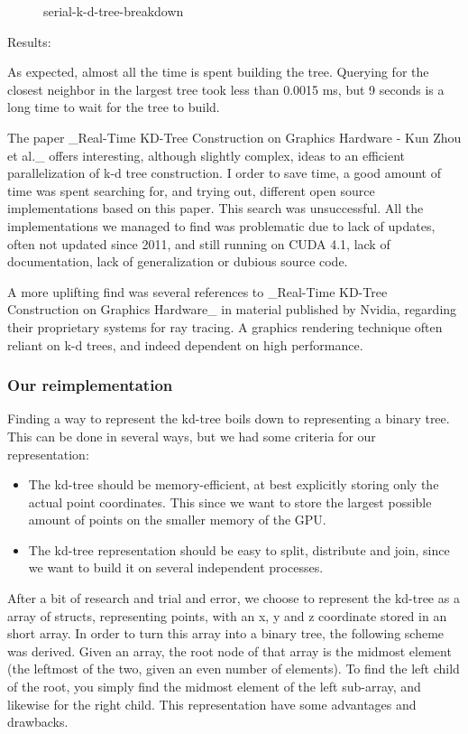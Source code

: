 \begin{enumerate}
\begin{enumerate}
\begin{figure}[ht!]
\caption{serial-k-d-tree-breakdown}
\label{fig:serial_kd_tree_breakdown}
\end{figure}

Results:

As expected, almost all the time is spent building the tree. Querying for the closest neighbor in the largest tree took less than 0.0015 ms, but 9 seconds is a long time to wait for the tree to build.

The paper _Real-Time KD-Tree Construction on Graphics Hardware - Kun Zhou et al._ offers interesting, although slightly complex, ideas to an efficient parallelization of k-d tree construction. I order to save time, a good amount of time was spent searching for, and trying out, different open source implementations based on this paper. This search was unsuccessful. All the implementations we managed to find was problematic due to lack of updates, often not updated since 2011, and still running on CUDA 4.1, lack of documentation, lack of generalization or dubious source code.

A more uplifting find was several references to _Real-Time KD-Tree Construction on Graphics Hardware_ in material published by Nvidia, regarding their proprietary systems for ray tracing. A graphics rendering technique often reliant on k-d trees, and indeed dependent on high performance.

\subsubsection{Our reimplementation} %
\label{ssub:our_reimplementation}

Finding a way to represent the kd-tree boils down to representing a binary tree. This can be done in several ways, but we had some criteria for our representation:

\begin{itemize}
    \item The kd-tree should be memory-efficient, at best explicitly storing only the actual point coordinates. This since we want to store the largest possible amount of points on the smaller memory of the GPU.
    \item The kd-tree representation should be easy to split, distribute and join, since we want to build it on several independent processes.
\end{itemize}

After a bit of research and trial and error, we choose to represent the kd-tree as a array of structs, representing points, with an x, y and z coordinate stored in an short array. In order to turn this array into a binary tree, the following scheme was derived. Given an array, the root node of that array is the midmost element (the leftmost of the two, given an even number of elements). To find the left child of the root, you simply find the midmost element of the left sub-array, and likewise for the right child. This representation have some advantages and drawbacks.


\end{enumerate}
\end{enumerate}
